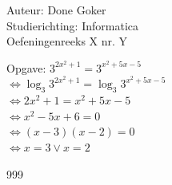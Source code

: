 \documentclass[a4paper]{article}
\begin{document}
  
\noindent \large Auteur: Done Goker \\
\noindent \large Studierichting: Informatica\\
\noindent \large Oefeningenreeks X nr. Y\\

\medskip

\normalsize



Opgave: $  3^{2x^2 + 1} = 3^{x^2 + 5x -5}$ \\

$\Leftrightarrow \log_{3} 3^{2x^2 + 1}= \log_{3} 3^{x^2 + 5x -5}$ \\

$\Leftrightarrow 2x^2 + 1 = x^2 + 5x -5$ \\

$\Leftrightarrow x^2 -5x + 6 = 0$ \\

$\Leftrightarrow  (x -3) (x -2) = 0 $ \\

$\Leftrightarrow  x = 3 \vee x = 2$ \\


\begin{thebibliography}{999}
\end{thebibliography}
\end{document}
